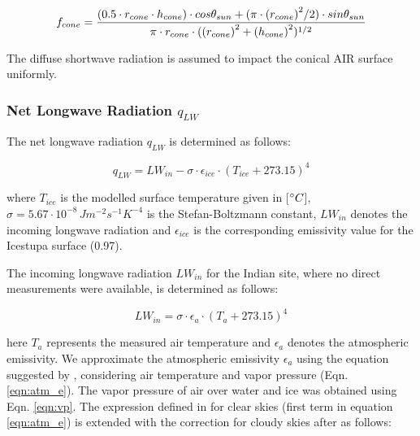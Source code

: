 \begin{equation}
	\begin{split}
		f_{cone}& =\frac{(0.5 \cdot r_{cone} \cdot h_{cone}) \cdot cos \theta_{sun} +(\pi \cdot
			{(r_{cone})}^2/2) \cdot sin \theta_{sun} }{\pi \cdot r_{cone} \cdot ({(r_{cone})}^2+{(h_{cone})}^2)^{1/2}}\\
	\end{split}
	\label{eqn:f_{cone} }
\end{equation}

The diffuse shortwave radiation is assumed to impact the conical AIR surface uniformly.

\subsubsection{Net Longwave Radiation \texorpdfstring{$q_{LW}$}{Lg}} \label{sec:LW}

The net longwave radiation $q_{LW}$ is determined as follows:

\begin{equation}
	q_{LW}= LW_{in}-\sigma \cdot \epsilon_{ice} \cdot {(T_{ice}+ 273.15)}^4
	\label{eqn:LW}
\end{equation}

where $T_{ice}$ is the modelled surface temperature given in [$^{\circ} C$],
$\sigma=5.67\cdot10^{-8}\,Jm^{-2}s^{-1}K^{-4}$ is the Stefan-Boltzmann constant, $LW_{in}$ denotes the incoming
longwave radiation and $\epsilon_{ice}$ is the corresponding emissivity value for the Icestupa surface (0.97).

The incoming longwave radiation $LW_{in}$ for the Indian site, where no direct measurements were available, is
determined as follows:

\begin{equation}
	LW_{in}=\sigma \cdot \epsilon_a \cdot {(T_a+ 273.15)}^4
	\label{eqn:LWin}
\end{equation}

here $T_a$ represents the measured air temperature and $\epsilon_a$ denotes the atmospheric emissivity. We
approximate the atmospheric emissivity $\epsilon_a$ using the equation suggested by \cite{brutsaertEvaporationAtmosphereTheory1982},
considering air temperature and vapor pressure (Eqn.  \ref{eqn:atm_e}). The vapor pressure of air over water and
ice was obtained using Eqn. \ref{eqn:vp}.  The expression defined in \cite{brutsaertDerivableFormulaLongwave1975} for clear skies
(first term in equation \ref{eqn:atm_e}) is extended with the correction for cloudy skies after
\cite{brutsaertEvaporationAtmosphereTheory1982} as follows:

